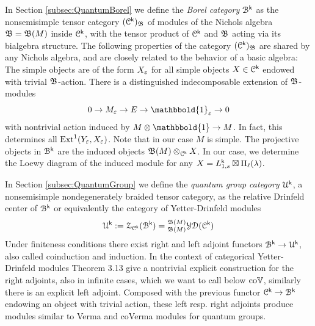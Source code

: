 \documentclass[a4paper, reqno]{amsart}
\theoremstyle{introTheorems}
\newcommand\cB{\mathcal{B}}
\newcommand\cC{\mathcal{C}}
\newcommand\cU{\mathcal{U}}
\newcommand\cZ{\mathcal{Z}}
\newcommand{\Ext}{\textup{Ext}}
\renewcommand{\1}{\mathbbold{1}}
\begin{document}
In Section \ref{subsec:QuantumBorel} we define the \emph{Borel category} $\cB^\k$ as the nonsemisimple tensor category $(\cC^\k)_{\NicholsOf}$ of modules of the Nichols algebra $\mathfrak{B}=\mathfrak{B}(M)$ inside $\cC^\k$, with the tensor product of $\cC^\k$ and $\mathfrak{B}$ acting via its bialgebra structure.
%
The following properties of the  category $(\cC^\k)_\NicholsOf$ are shared by any Nichols algebra, and are closely related to the behavior of a basic algebra: The simple objects are of the form $X_\varepsilon$ for all simple objects $X\in \cC^\k$ endowed with trivial $\mathfrak{B}$-action. There is a distinguished indecomposable extension of $\mathfrak{B}$-modules   
$$0\to M_\NicholsAlgebraCounit\to E\to \1_\NicholsAlgebraCounit\to 0$$
with nontrivial action induced by $M\otimes \1\to M$. In fact, this determines all $\Ext^1(Y_\NicholsAlgebraCounit,X_\NicholsAlgebraCounit)$. Note that in our case $M$ is simple. The projective objects in $\cB^\k$ are the induced objects $\NicholsOf(M)\otimes_{\cC^\k} X$. In our case, we determine the Loewy diagram of the induced module for any $X=L^{\mathsf{k}}_{1, s} \boxtimes \Pi_{\ell}(\lambda)$. 
\begin{center}
\end{center}   
In Section \ref{subsec:QuantumGroup} we define the \emph{quantum group category} $\cU^\k$, a nonsemisimple nondegenerately braided tensor category, as the relative  Drinfeld center of $\cB^\k$ or equivalently the category of Yetter-Drinfeld modules 
\[
\cU^\k:=\cZ_{\cC^\k}(\cB^\k)=\YD{\NicholsOf(M)}(\cC^\k)
\]
Under finiteness conditions there exist  right and left adjoint functors $\cB^\k\to \cU^\k$, also called coinduction and induction.
In the context of categorical Yetter-Drinfeld modules \cite{LW21} Theorem 3.13 give a  nontrivial explicit construction for the right adjoints, also in infinite cases, which we want to call below $\mathrm{co}\mathbb{V}$, similarly there is an explicit left adjoint. Composed with the previous functor $\cC^\k \to\cB^\k$ endowing an object with trivial action, these left resp. right adjoints produce modules similar to Verma and coVerma modules for quantum groups.  
\end{document}
